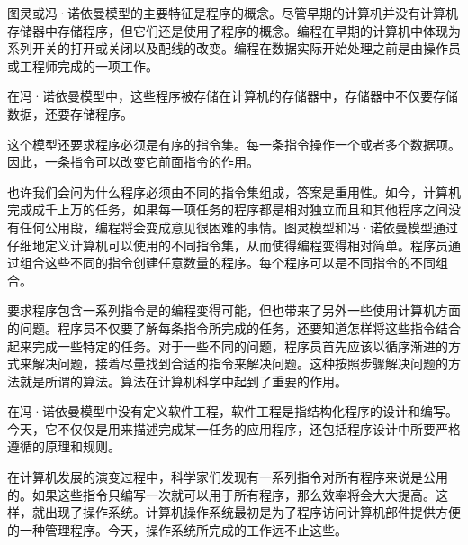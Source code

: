 图灵或冯·诺依曼模型的主要特征是程序的概念。尽管早期的计算机并没有计算机存储器中存储程序，但它们还是使用了程序的概念。编程在早期的计算机中体现为系列开关的打开或关闭以及配线的改变。编程在数据实际开始处理之前是由操作员或工程师完成的一项工作。

在冯·诺依曼模型中，这些程序被存储在计算机的存储器中，存储器中不仅要存储数据，还要存储程序。

这个模型还要求程序必须是有序的指令集。每一条指令操作一个或者多个数据项。因此，一条指令可以改变它前面指令的作用。

也许我们会问为什么程序必须由不同的指令集组成，答案是重用性。如今，计算机完成成千上万的任务，如果每一项任务的程序都是相对独立而且和其他程序之间没有任何公用段，编程将会变成意见很困难的事情。图灵模型和冯·诺依曼模型通过仔细地定义计算机可以使用的不同指令集，从而使得编程变得相对简单。程序员通过组合这些不同的指令创建任意数量的程序。每个程序可以是不同指令的不同组合。

要求程序包含一系列指令是的编程变得可能，但也带来了另外一些使用计算机方面的问题。程序员不仅要了解每条指令所完成的任务，还要知道怎样将这些指令结合起来完成一些特定的任务。对于一些不同的问题，程序员首先应该以循序渐进的方式来解决问题，接着尽量找到合适的指令来解决问题。这种按照步骤解决问题的方法就是所谓的算法。算法在计算机科学中起到了重要的作用。

在冯·诺依曼模型中没有定义软件工程，软件工程是指结构化程序的设计和编写。今天，它不仅仅是用来描述完成某一任务的应用程序，还包括程序设计中所要严格遵循的原理和规则。

在计算机发展的演变过程中，科学家们发现有一系列指令对所有程序来说是公用的。如果这些指令只编写一次就可以用于所有程序，那么效率将会大大提高。这样，就出现了操作系统。计算机操作系统最初是为了程序访问计算机部件提供方便的一种管理程序。今天，操作系统所完成的工作远不止这些。
